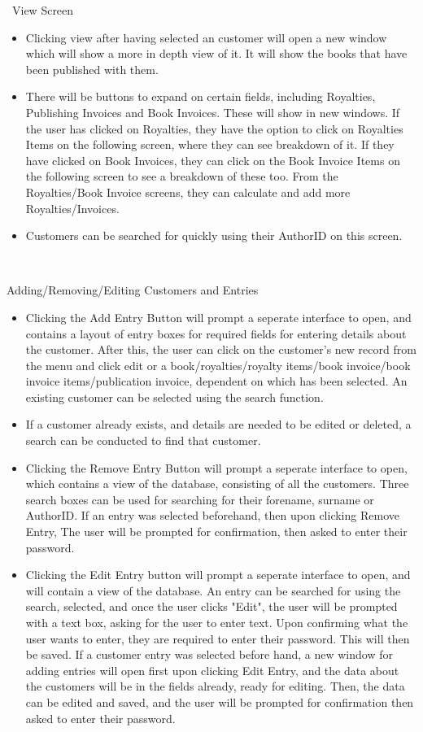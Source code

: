 \
View Screen
\begin{itemize}
    \item Clicking view after having selected an customer will open a new window which will show a more in depth view of it. It will show the books that have been published with them.
    \item There will be buttons to expand on certain fields, including Royalties, Publishing Invoices and Book Invoices. These will show in new windows. If the user has clicked on Royalties, they have the option to click on Royalties Items on the following screen, where they can see breakdown of it. If they have clicked on Book Invoices, they can click on the Book Invoice Items on the following screen to see a breakdown of these too. From the Royalties/Book Invoice screens, they can calculate and add more Royalties/Invoices.
    \item Customers can be searched for quickly using their AuthorID on this screen.
\end{itemize}

\

Adding/Removing/Editing Customers and Entries
\begin{itemize}
    \item Clicking the Add Entry Button will prompt a seperate interface to open, and contains a layout of entry boxes for required fields for entering details about the customer. After this, the user can click on the customer's new record from the menu and click edit or a book/royalties/royalty items/book invoice/book invoice items/publication invoice, dependent on which has been selected. An existing customer can be selected using the search function.
    \item If a customer already exists, and details are needed to be edited or deleted, a search can be conducted to find that customer.
    \item Clicking the Remove Entry Button will prompt a seperate interface to open, which contains a view of the database, consisting of all the customers. Three search boxes can be used for searching for their forename, surname or AuthorID. If an entry was selected beforehand, then upon clicking Remove Entry, The user will be prompted for confirmation, then asked to enter their password. 
    \item Clicking the Edit Entry button will prompt a seperate interface to open, and will contain a view of the database. An entry can be searched for using the search, selected, and once the user clicks "Edit", the user will be prompted with a text box, asking for the user to enter text. Upon confirming what the user wants to enter, they are required to enter their password. This will then be saved. If a customer entry was selected before hand, a new window for adding entries will open first upon clicking Edit Entry, and the data about the customers will be in the fields already, ready for editing. Then, the data can be edited and saved, and the user will be prompted for confirmation then asked to enter their password.
\end{itemize}

